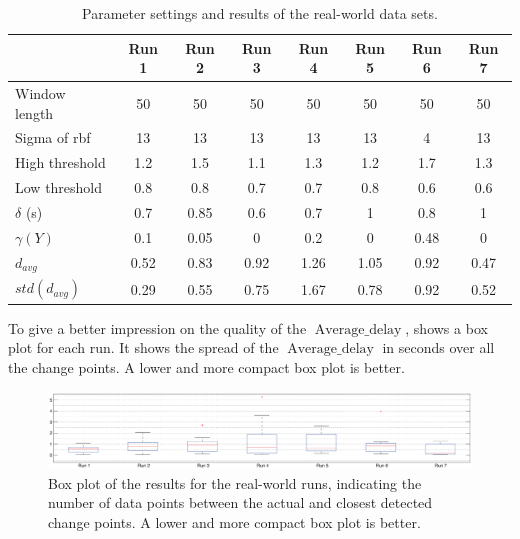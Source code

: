 \begin{table}
  \centering
  \caption[Results real world runs]{Parameter settings and results of the real-world data sets.}
  \begin{tabulary}{\textwidth}{|l|c|c|c|c|c|c|c|}
     & Run 1 & Run 2 & Run 3 & Run 4 & Run 5 & Run 6 & Run 7 \\
    \hline
    Window length & 50 & 50 & 50 & 50 & 50 & 50 & 50 \\
    \hline
    Sigma of \gls{rbf} & 13 & 13 & 13 & 13 & 13 & 4 & 13 \\
    \hline
    High threshold & 1.2 & 1.5 & 1.1 & 1.3 & 1.2 & 1.7 & 1.3 \\
    \hline
    Low threshold & 0.8 & 0.8 & 0.7 & 0.7 & 0.8 & 0.6 & 0.6 \\
    \hline
    $\delta$ (s) & 0.7 & 0.85 & 0.6 & 0.7 & 1 & 0.8 & 1 \\
    \hline
    \hline
    $\gamma(Y)$ & 0.1 & 0.05 & 0 & 0.2 & 0 & 0.48 & 0 \\
    \hline
    $d_{avg}$ & 0.52 & 0.83 & 0.92 & 1.26 & 1.05 & 0.92 & 0.47 \\
    \hline
    $std(d_{avg})$ & 0.29 & 0.55 & 0.75 & 1.67 & 0.78 & 0.92 & 0.52 \\
    \hline
  \end{tabulary}
  \label{tab:results_real_world}
\end{table}

To give a better impression on the quality of the $\operatorname*{Average\_delay}$,  shows a box plot for each run.
It shows the spread of the $\operatorname*{Average\_delay}$ in seconds over all the change points.
A lower and more compact box plot is better.

\begin{figure}
\centering
  \includegraphics[width=1\textwidth]{./Figures/chapter6/data_collection/boxplot_results_real_world_runs.eps}
  \caption[Box plot results real-world runs]{Box plot of the results for the real-world runs, indicating the number of data points between the actual and closest detected change points. A lower and more compact box plot is better.}
  \label{fig:boxplot_real_world_runs}
\end{figure}

